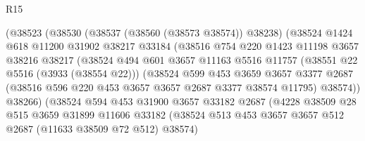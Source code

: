\begin{lexlean}{R15}
\begin{coremodule}
                          (@38523
                            (@38530
                              (@38537 (@38560 (@38573 @38574)) @38238)
                              (@38524
                                @1424
                                @618
                                @11200
                                @31902
                                @38217
                                @33184
                                (@38516
                                  @754
                                  @220
                                  @1423
                                  @11198
                                  @3657
                                  @38216
                                  @38217
                                  (@38524
                                    @494
                                    @601
                                    @3657
                                    @11163
                                    @5516
                                    @11757
                                    (@38551 @22 @5516 (@3933 (@38554 @22)))
                                    (@38524
                                      @599
                                      @453
                                      @3659
                                      @3657
                                      @3377
                                      @2687
                                      (@38516 @596 @220 @453 @3657 @3657 @2687 @3377 @38574 @11795)
                                      @38574))
                                  @38266)
                                (@38524
                                  @594
                                  @453
                                  @31900
                                  @3657
                                  @33182
                                  @2687
                                  (@4228
                                    @38509
                                    @28
                                    @515
                                    @3659
                                    @31899
                                    @11606
                                    @33182
                                    (@38524
                                      @513
                                      @453
                                      @3657
                                      @3657
                                      @512
                                      @2687
                                      (@11633 @38509 @72 @512)
                                      @38574)

\end{coremodule}
\end{lexlean}
